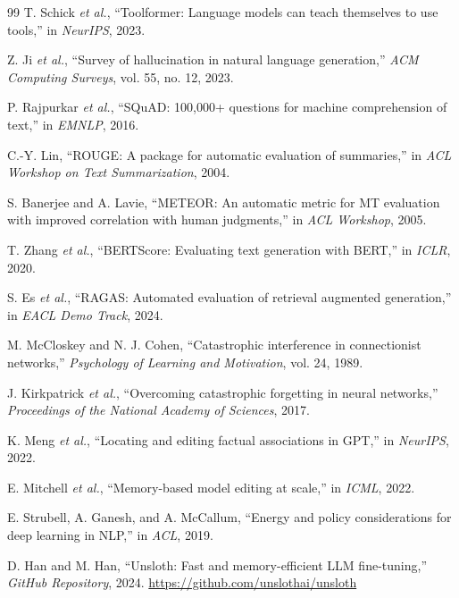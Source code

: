 \documentclass[10pt,journal,compsoc]{IEEEtran}
\begin{document}
\begin{thebibliography}{99}
T. Schick \textit{et al.},
``Toolformer: Language models can teach themselves to use tools,''
in \textit{NeurIPS}, 2023.

Z. Ji \textit{et al.},
``Survey of hallucination in natural language generation,''
\textit{ACM Computing Surveys}, vol. 55, no. 12, 2023.

P. Rajpurkar \textit{et al.},
``SQuAD: 100,000+ questions for machine comprehension of text,''
in \textit{EMNLP}, 2016.

C.-Y. Lin,
``ROUGE: A package for automatic evaluation of summaries,''
in \textit{ACL Workshop on Text Summarization}, 2004.

S. Banerjee and A. Lavie,
``METEOR: An automatic metric for MT evaluation with improved
correlation with human judgments,''
in \textit{ACL Workshop}, 2005.

T. Zhang \textit{et al.},
``BERTScore: Evaluating text generation with BERT,''
in \textit{ICLR}, 2020.

S. Es \textit{et al.},
``RAGAS: Automated evaluation of retrieval augmented generation,''
in \textit{EACL Demo Track}, 2024.

M. McCloskey and N. J. Cohen,
``Catastrophic interference in connectionist networks,''
\textit{Psychology of Learning and Motivation}, vol. 24, 1989.

J. Kirkpatrick \textit{et al.},
``Overcoming catastrophic forgetting in neural networks,''
\textit{Proceedings of the National Academy of Sciences}, 2017.

K. Meng \textit{et al.},
``Locating and editing factual associations in GPT,''
in \textit{NeurIPS}, 2022.

E. Mitchell \textit{et al.},
``Memory-based model editing at scale,''
in \textit{ICML}, 2022.

E. Strubell, A. Ganesh, and A. McCallum,
``Energy and policy considerations for deep learning in NLP,''
in \textit{ACL}, 2019.

D. Han and M. Han,
``Unsloth: Fast and memory-efficient LLM fine-tuning,''
\textit{GitHub Repository}, 2024.
\url{https://github.com/unslothai/unsloth}

\end{thebibliography}
\end{document}
